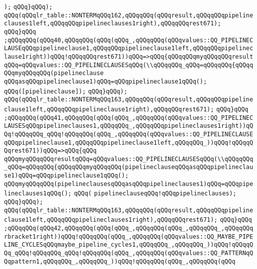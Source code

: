 \verb|);|\newline
\verb|qQQq}qQQq);|\newline
\verb|qQQq(qQQqlr_table::NONTERMqQQq162,qQQqqQQq(qQQqresult,qQQqqQQqpipelineclauses1left,qQQqqQQqpipelineclauses1right),qQQqqQQqrest671);|\newline
\verb|qQQq}qQQq|\newline
\verb|;qQQqqQQq(qQQq40,qQQqqQQq(qQQq(qQQq_,qQQqqQQq(qQQqvalues::QQ_PIPELINECLAUSEqQQqpipelineclause1,qQQqqQQqpipelineclause1left,qQQqqQQqpipelineclause1right))qQQq!qQQqqQQqrest671))qQQq=>qQQq{qQQqqQQqmyqQQqqQQqresultqQQq=qQQqvalues::QQ_PIPELINECLAUSESqQQq(\\qQQqqQQq_qQQq=qQQqqQQq{qQQqqQQqmyqQQqqQQq(pipelineclause|\newline
\verb|qQQqasqQQqpipelineclause1)qQQq=qQQqpipelineclause1qQQq();|\newline
\verb|qQQq([pipelineclause]);|\newline
\verb|qQQq}qQQq);|\newline
\verb|qQQq(qQQqlr_table::NONTERMqQQq163,qQQqqQQq(qQQqresult,qQQqqQQqpipelineclause1left,qQQqqQQqpipelineclause1right),qQQqqQQqrest671);|\newline
\verb|qQQq}qQQq|\newline
\verb|;qQQqqQQq(qQQq41,qQQqqQQq(qQQq(qQQq_,qQQqqQQq(qQQqvalues::QQ_PIPELINECLAUSESqQQqpipelineclauses1,qQQqqQQq_,qQQqqQQqpipelineclauses1right))qQQq!qQQqqQQq_qQQq!qQQqqQQq(qQQq_,qQQqqQQq(qQQqvalues::QQ_PIPELINECLAUSEqQQqpipelineclause1,qQQqqQQqpipelineclause1left,qQQqqQQq_))qQQq!qQQqqQQqrest671))qQQq=>qQQq{qQQq|\newline
\verb|qQQqmyqQQqqQQqresultqQQq=qQQqvalues::QQ_PIPELINECLAUSESqQQq(\\qQQqqQQq_qQQq=qQQqqQQq{qQQqqQQqmyqQQqqQQq(pipelineclauseqQQqasqQQqpipelineclause1)qQQq=qQQqpipelineclause1qQQq();|\newline
\verb|qQQqmyqQQqqQQq(pipelineclausesqQQqasqQQqpipelineclauses1)qQQq=qQQqpipelineclauses1qQQq();|\newline
\verb|qQQq(|\newline
\verb|pipelineclauseqQQq!qQQqpipelineclauses);|\newline
\verb|qQQq}qQQq);|\newline
\verb|qQQq(qQQqlr_table::NONTERMqQQq163,qQQqqQQq(qQQqresult,qQQqqQQqpipelineclause1left,qQQqqQQqpipelineclauses1right),qQQqqQQqrest671);|\newline
\verb|qQQq}qQQq|\newline
\verb|;qQQqqQQq(qQQq42,qQQqqQQq(qQQq(qQQq_,qQQqqQQq(qQQq_,qQQqqQQq_,qQQqqQQqrbracket1right))qQQq!qQQqqQQq(qQQq_,qQQqqQQq(qQQqvalues::QQ_MAYBE_PIPELINE_CYCLESqQQqmaybe_pipeline_cycles1,qQQqqQQq_,qQQqqQQq_))qQQq!qQQqqQQq_qQQq!qQQqqQQq_qQQq!qQQqqQQq(qQQq_,qQQqqQQq(qQQqvalues::QQ_PATTERNqQQqpattern1,qQQqqQQq_,qQQqqQQq_))qQQq!qQQqqQQq(qQQq_,qQQqqQQq(qQQq|\newline
